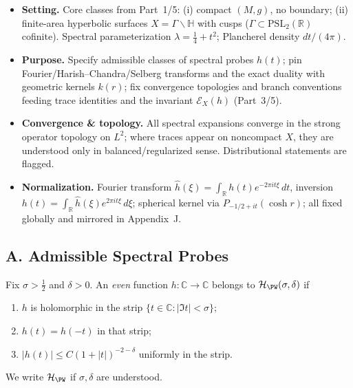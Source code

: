 \begin{tcolorbox}[colback=gray!5,colframe=gray!55,
  title=Scope \& Assumptions (ZNB-9+++ Brilliants+++ • enforced)]
\begin{itemize}
  \item \textbf{Setting.} Core classes from Part~1/5: (i) compact $(M,g)$, no boundary; (ii) finite-area hyperbolic surfaces $X=\Gamma\backslash\mathbb H$ with cusps ($\Gamma\subset\mathrm{PSL}_2(\mathbb R)$ cofinite). Spectral parameterization $\lambda=\tfrac14+t^2$; Plancherel density $dt/(4\pi)$.
  \item \textbf{Purpose.} Specify admissible classes of spectral probes $h(t)$; pin Fourier/Harish–Chandra/Selberg transforms and the exact duality with geometric kernels $k(r)$; fix convergence topologies and branch conventions feeding trace identities and the invariant $\mathcal E_X(h)$ (Part~3/5).
  \item \textbf{Convergence \& topology.} All spectral expansions converge in the strong operator topology on $L^2$; where traces appear on noncompact $X$, they are understood only in balanced/regularized sense. Distributional statements are flagged.
  \item \textbf{Normalization.} Fourier transform
  \(
    \hat h(\xi)=\int_{\mathbb R} h(t)e^{-2\pi i t\xi}\,dt
  \),
  inversion
  \(
    h(t)=\int_{\mathbb R}\hat h(\xi)e^{2\pi i t\xi}\,d\xi
  \);
  spherical kernel via $P_{-1/2+it}(\cosh r)$; all fixed globally and mirrored in Appendix~J.
\end{itemize}
\end{tcolorbox}

\subsection*{A. Admissible Spectral Probes}
\label{subsec:admissible-h-sharp}

\begin{definition}
\label{def:admissible-sharp}
Fix $\sigma>\tfrac12$ and $\delta>0$. An \emph{even} function $h:\mathbb C\to\mathbb C$ belongs to $\mathcal H_{\PW}(\sigma,\delta)$ if
\begin{enumerate}[label=(\roman*)]
  \item $h$ is holomorphic in the strip $\{t\in\mathbb C:|\Im t|<\sigma\}$;
  \item $h(t)=h(-t)$ in that strip;
  \item $|h(t)|\le C(1+|t|)^{-2-\delta}$ uniformly in the strip.
\end{enumerate}
We write $\mathcal H_{\PW}$ if $\sigma,\delta$ are understood.
\end{definition}

